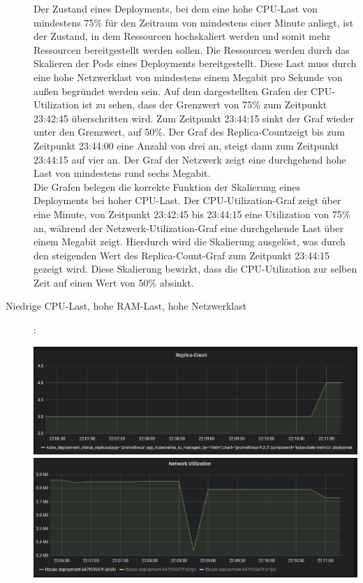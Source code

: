 \documentclass[a4paper,10pt]{scrartcl}
\begin{document}
\begin{description}
Der Zustand eines Deployments, bei dem eine hohe CPU-Last von mindestens 75\% für den Zeitraum von mindestens einer Minute anliegt, ist der Zustand, in dem Ressourcen hochskaliert werden und somit mehr Ressourcen bereitgestellt werden sollen. Die Ressourcen werden durch das Skalieren der Pods eines Deployments bereitgestellt. Diese Last muss durch eine hohe Netzwerklast von mindestens einem Megabit pro Sekunde von außen begründet werden sein.
Auf dem dargestellten Grafen der CPU-Utilization ist zu sehen, dass der Grenzwert von 75\% zum Zeitpunkt 23:42:45 überschritten wird. Zum Zeitpunkt 23:44:15 sinkt der Graf wieder unter den Grenzwert, auf 50\%. Der Graf des \glqq Replica-Count\grqq zeigt bis zum Zeitpunkt 23:44:00 eine Anzahl von drei an, steigt dann zum Zeitpunkt 23:44:15 auf vier an. Der Graf der Netzwerk zeigt eine durchgehend hohe Last von mindestens rund sechs Megabit.\\
Die Grafen belegen die korrekte Funktion der Skalierung eines Deployments bei hoher CPU-Last. Der CPU-Utilization-Graf zeigt über eine Minute, von Zeitpunkt 23:42:45 bis 23:44:15 eine Utilization von 75\% an, während der Netzwerk-Utilization-Graf eine durchgehende Last über einem Megabit zeigt. Hierdurch wird die Skalierung ausgelöst, was durch den steigenden Wert des \glqq Replica-Count\grqq -Graf zum Zeitpunkt 23:44:15 gezeigt wird. Diese Skalierung bewirkt, dass die CPU-Utilization zur selben Zeit auf einen Wert von 50\% absinkt.

\pagebreak

\item[Niedrige CPU-Last, hohe RAM-Last, hohe Netzwerklast]:\\

\begin{minipage}{\linewidth}
            \includegraphics[width=1\textwidth]{img/RAMSkalierung/Replica-Count.PNG}\\
            
            \includegraphics[width=1\textwidth,height=.14\textheight]{img/RAMSkalierung/Netzwerk.PNG}\\
            

\end{minipage}
\end{description}
\end{document}
